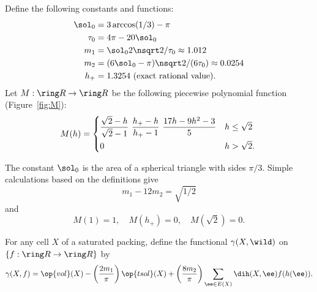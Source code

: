 \begin{cnl}
\begin{definition}
\label{def:sol0}
%
Define the following constants and functions: 
\begin{align}\label{eqn:m-def} 
\sol_0 &= 3\arccos(1/3)-\pi\\
\tau_0 &= 4\pi  - 20\sol_0\\
m_1 &= \sol_0 2\nsqrt2/\tau_0 \approx 1.012 \\ %
m_2  &=  (6\sol_0- \pi)\nsqrt2/(6 \tau_0) \approx 0.0254\\ %
h_+ &= 1.3254 \hbox{~(exact rational value).}
\end{align}
Let $M:\Real\to\Real$ 
be the following piecewise polynomial function (Figure~\ref{fig:M}):
\begin{equation}\label{eqn:M} 
M(h) =
\begin{cases} 
\dfrac{\sqrt2-h}{\sqrt2-1}~%
\dfrac{h_+-h}{h_+-1} ~\dfrac{17 h - 9 h^2 - 3}{5} 
& h \le \sqrt2\vspace{3pt} \\
0 & h >\sqrt2.
\end{cases}
\\
\end{equation}
\end{definition}

\figTULIGLY %

The constant $\sol_0$
is the area of a spherical triangle with sides $\pi/3$.
Simple calculations based on the definitions give
\begin{equation}\label{eqn:km}
m_1 - 12m_2 = \sqrt{1/2}
\end{equation} 
and
\begin{equation}
M(1) = 1,\quad M(h_+)=0,\quad M(\sqrt2) =0.
\end{equation} 


\begin{definition}[$\gammaX$]
\label{def:gammaX}
%
For any cell $X$ of a saturated packing, define the functional
$\gammaX(X,\wild)$ on $\{f:\Real\to\Real\}$ by
\begin{equation}\label{eqn:gamma-def} 
\gammaX(X,f) =  \op{vol}(X)
-\left(\frac{2m_1}{\pi}\right) \op{tsol}(X) + \left(\frac{8m_2}{\pi}\right)
\sumfinitepred{\ee}{\ee\in E(X)}{ \dih(X,\ee)  f(h(\ee))}.
\end{equation}
\end{definition}



\end{cnl}
